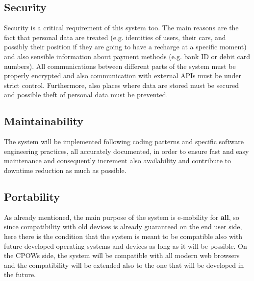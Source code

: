\documentclass[a4paper]{report}
\begin{document}
\subsection{Security}
Security is a critical requirement of this system too. The main reasons are the fact that personal data are treated (e.g. identities of users, their cars, and possibly their position if they are going to have a recharge at a specific moment) and also sensible information about payment methods (e.g. bank ID or debit card numbers). All communications between different parts of the system must be properly encrypted and also communication with external APIs must be under strict control. Furthermore, also places where data are stored must be secured and possible theft of personal data must be prevented.

\subsection{Maintainability}
The system will be implemented following coding patterns and specific software engineering practices, all accurately documented, in order to ensure fast and easy maintenance and consequently increment also availability and contribute to downtime reduction as much as possible.

\subsection{Portability}
As already mentioned, the main purpose of the system is e-mobility for \textbf{all}, so since compatibility with old devices is already guaranteed on the end user side, here there is the condition that the system is meant to be compatible also with future developed operating systems and devices as long as it will be possible. On the CPOWs side, the system will be compatible with all modern web browsers and the compatibility will be extended also to the one that will be developed in the future.
\end{document}
